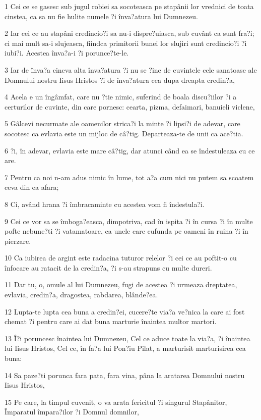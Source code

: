\par 1 Cei ce se gasesc sub jugul robiei sa socoteasca pe stapânii lor vrednici de toata cinstea, ca sa nu fie hulite numele ?i înva?atura lui Dumnezeu.
\par 2 Iar cei ce au stapâni credincio?i sa nu-i dispre?uiasca, sub cuvânt ca sunt fra?i; ci mai mult sa-i slujeasca, fiindca primitorii bunei lor slujiri sunt credincio?i ?i iubi?i. Acestea înva?a-i ?i porunce?te-le.
\par 3 Iar de înva?a cineva alta înva?atura ?i nu se ?ine de cuvintele cele sanatoase ale Domnului nostru Iisus Hristos ?i de înva?atura cea dupa dreapta credin?a,
\par 4 Acela e un îngâmfat, care nu ?tie nimic, suferind de boala discu?iilor ?i a certurilor de cuvinte, din care pornesc: cearta, pizma, defaimari, banuieli viclene,
\par 5 Gâlcevi necurmate ale oamenilor strica?i la minte ?i lipsi?i de adevar, care socotesc ca evlavia este un mijloc de câ?tig. Departeaza-te de unii ca ace?tia.
\par 6 ?i, în adevar, evlavia este mare câ?tig, dar atunci când ea se îndestuleaza cu ce are.
\par 7 Pentru ca noi n-am adus nimic în lume, tot a?a cum nici nu putem sa scoatem ceva din ea afara;
\par 8 Ci, având hrana ?i îmbracaminte cu acestea vom fi îndestula?i.
\par 9 Cei ce vor sa se îmboga?easca, dimpotriva, cad în ispita ?i în cursa ?i în multe pofte nebune?ti ?i vatamatoare, ca unele care cufunda pe oameni în ruina ?i în pierzare.
\par 10 Ca iubirea de argint este radacina tuturor relelor ?i cei ce au poftit-o cu înfocare au ratacit de la credin?a, ?i s-au strapuns cu multe dureri.
\par 11 Dar tu, o, omule al lui Dumnezeu, fugi de acestea ?i urmeaza dreptatea, evlavia, credin?a, dragostea, rabdarea, blânde?ea.
\par 12 Lupta-te lupta cea buna a credin?ei, cucere?te via?a ve?nica la care ai fost chemat ?i pentru care ai dat buna marturie înaintea multor martori.
\par 13 Î?i poruncesc înaintea lui Dumnezeu, Cel ce aduce toate la via?a, ?i înaintea lui Iisus Hristos, Cel ce, în fa?a lui Pon?iu Pilat, a marturisit marturisirea cea buna:
\par 14 Sa paze?ti porunca fara pata, fara vina, pâna la aratarea Domnului nostru Iisus Hristos,
\par 15 Pe care, la timpul cuvenit, o va arata fericitul ?i singurul Stapânitor, Împaratul împara?ilor ?i Domnul domnilor,
